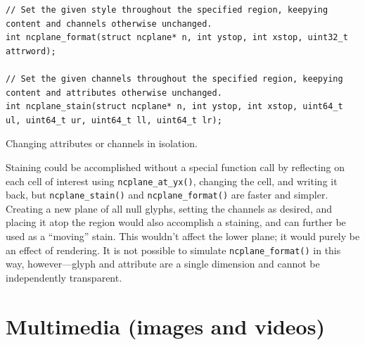 \documentclass[letterpaper,10pt]{article}
\begin{document}
\begin{listing}[!htb]
\begin{verbatim}
// Set the given style throughout the specified region, keepying content and channels otherwise unchanged.
int ncplane_format(struct ncplane* n, int ystop, int xstop, uint32_t attrword);

// Set the given channels throughout the specified region, keepying content and attributes otherwise unchanged.
int ncplane_stain(struct ncplane* n, int ystop, int xstop, uint64_t ul, uint64_t ur, uint64_t ll, uint64_t lr);
\end{verbatim}
\caption{Changing attributes or channels in isolation.}
\label{list:stain}
\end{listing}

Staining could be accomplished without a special function call by reflecting
on each cell of interest using \texttt{ncplane\_at\_yx()}, changing the cell,
and writing it back, but \texttt{ncplane\_stain()} and \texttt{ncplane\_format()}
are faster and simpler. Creating a new plane of all null glyphs, setting the
channels as desired, and placing it atop the region would also accomplish a
staining, and can further be used as a ``moving'' stain. This wouldn't affect
the lower plane; it would purely be an effect of rendering. It is not possible
to simulate \texttt{ncplane\_format()} in this way, however---glyph and
attribute are a single dimension and cannot be independently transparent.

\cleardoublepage

\section{Multimedia (images and videos)}
\label{sec:libav}
\end{document}
